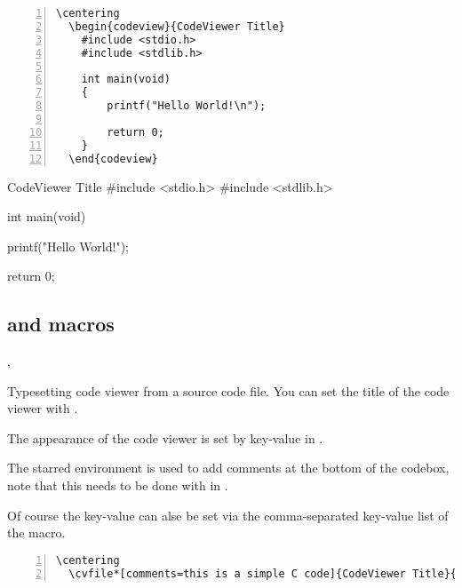 \documentclass{ctxdoc-en}
\begin{document}
\begin{Verbatim}[frame=none,numbers=left,gobble=2]
  \centering
  \begin{codeview}{CodeViewer Title}
    #include <stdio.h>
    #include <stdlib.h>

    int main(void)
    {
        printf("Hello World!\n");

        return 0;
    }
  \end{codeview}
\end{Verbatim}

\begin{center}
  \begin{minipage}{0.85\textwidth}
    \begin{codeview}{CodeViewer Title}
      #include <stdio.h>
      #include <stdlib.h>

      int main(void)
      {
          printf("Hello World!\n");

          return 0;
      }
    \end{codeview}
  \end{minipage}
\end{center}

\subsection{ and  macros}

\begin{function}[added=2021-12-26,updated=2021-12-26]{\cvfile,\cvfile*}
  \begin{syntax}
        
       
  \end{syntax}
  Typesetting code viewer from a source code file.
  You can set the title of the code viewer with .

  The appearance of the code viewer is set by key-value in .

  The starred environment  is used to add comments at the bottom of the codebox,
  note that this needs to be done with  in .

  Of course the key-value  can alse be set
  via the comma-separated key-value list of the  macro.
\end{function}

\begin{Verbatim}[frame=none,numbers=left,gobble=2]
  \centering
  \cvfile*[comments=this is a simple C code]{CodeViewer Title}{test.c}
\end{Verbatim}
\end{document}
